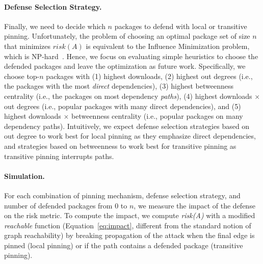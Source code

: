 \paragraph{Defense Selection Strategy.}
Finally, we need to decide which $n$ packages to defend with local or transitive pinning.
Unfortunately, the problem of choosing an optimal package set of size $n$ that minimizes $risk(A)$ is equivalent to the Influence Minimization problem, which is NP-hard~\cite{DBLP:conf/icde/0002ZW0023}.
Hence, we focus on evaluating simple heuristics to choose the defended packages and leave the optimization as future work.
Specifically, we choose top-$n$ packages with (1) highest downloads, (2) highest out degrees (i.e., the packages with the most \textit{direct} dependencies), (3) highest betweenness centrality (i.e., the packages on most dependency \textit{paths}), (4) highest downloads $\times$ out degrees (i.e., popular packages with many direct dependencies), and (5) highest downloads $\times$ betweenness centrality (i.e., popular packages on many dependency paths).
Intuitively, we expect defense selection strategies based on out degree to work best for local pinning as they emphasize direct dependencies, and strategies based on betweenness to work best for transitive pinning as transitive pinning interrupts paths.

\paragraph{Simulation.}
For each combination of pinning mechanism, defense selection strategy, and number of defended packages from 0 to $n$, we measure the impact of the defense on the risk metric. To compute the impact, we compute \textit{risk(A)} with a modified \textit{reachable} function (Equation~\ref{eq:impact}, different from the standard notion of graph reachability) by breaking propagation of the attack when the final edge is pinned (local pinning) or if the path contains a defended package (transitive pinning).


